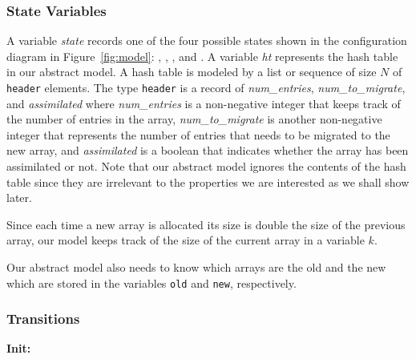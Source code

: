 \subsubsection{State Variables}

A variable \emph{state} records one of the four possible states shown
in the configuration diagram in Figure~\ref{fig:model}:
\emph{\pczero}, \emph{\pcone}, \emph{\pctwo}, and \emph{\pcthree}.
%
A variable \emph{ht} represents the hash table in our abstract model.
A hash table is modeled by a list or sequence of size $N$ of
\texttt{header} elements. The type \texttt{header} is a record of
\emph{num\_entries}, \emph{num\_to\_migrate}, and \emph{assimilated}
where \emph{num\_entries} is a non-negative integer that keeps track
of the number of entries in the array, \emph{num\_to\_migrate} is
another non-negative integer that represents the number of entries
that needs to be migrated to the new array, and \emph{assimilated} is
a boolean that indicates whether the array has been assimilated or
not. Note that our abstract model ignores the contents of the hash
table since they are irrelevant to the properties we are interested as
we shall show later. 



Since each time a new array is allocated its size is double the size
of the previous array, our model keeps track of the size of the
current array in a variable $k$.

Our abstract model also needs to know which arrays are the old and the
new which are stored in the variables \texttt{old} and \texttt{new},
respectively.



\subsubsection{Transitions}

\noindent \textbf{Init:} \vspace{1mm}

\begin{minipage}{\linewidth}
\end{minipage}


